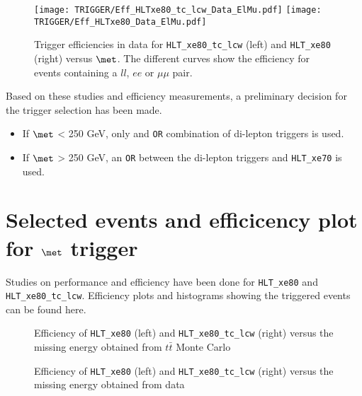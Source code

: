 \begin{figure}[htb!]
\centering
\texttt{[image: TRIGGER/Eff\_HLTxe80\_tc\_lcw\_Data\_ElMu.pdf]}
\texttt{[image: TRIGGER/Eff\_HLTxe80\_Data\_ElMu.pdf]}
\caption{Trigger efficiencies in data for \texttt{HLT\_xe80\_tc\_lcw} (left) and \texttt{HLT\_xe80} (right) versus $\met$. The different curves show the efficiency for events containing a $ll$, $ee$ or $\mu\mu$ pair.}
 \label{fig:triggerEff_leptons_DATA}
\end{figure}

Based on these studies and efficiency measurements, a preliminary decision for the trigger selection has been made.

\begin{itemize}

\item If $\met$ < 250 GeV, only and \texttt{OR} combination of di-lepton triggers is used. 

\item If $\met$ > 250 GeV, an \texttt{OR} between the di-lepton triggers and \texttt{HLT\_xe70} is used.

\end{itemize}



\clearpage
\section{Selected events and efficicency plot for $\met$ trigger}
\label{app_HLT_xe80}

Studies on performance and efficiency have been done for \texttt{HLT\_xe80} and \texttt{HLT\_xe80\_tc\_lcw}. Efficiency plots and histograms showing the triggered events can be found here. 

\begin{figure}[h!]
\centering
{}
\caption{Efficiency of \texttt{HLT\_xe80} (left) and \texttt{HLT\_xe80\_tc\_lcw} (right) versus the missing energy obtained from $t\bar{t}$ Monte Carlo}
\label{fig:eff_trigger1}
\end{figure}

\begin{figure}[h!]
\centering
{}
\caption{Efficiency of \texttt{HLT\_xe80} (left) and \texttt{HLT\_xe80\_tc\_lcw} (right) versus the missing energy obtained from data}
\label{fig:eff_trigger2}
\end{figure}

